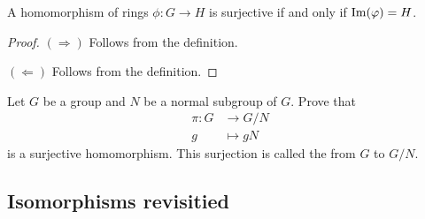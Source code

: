 \documentclass{ximera}
\begin{document}
\begin{lemma}
    A homomorphism of rings $\phi:G\to H$ is surjective if and only if
    $\operatorname{Im}(\varphi) = H$.
    \begin{proof}
      $(\Rightarrow)$ Follows from the definition.

      $(\Leftarrow)$ Follows from the definition.
    \end{proof}
\end{lemma}







\begin{exercise}
  Let $G$ be a group and $N$ be a normal subgroup of $G$. Prove that
  \begin{align*}
  \pi:G &\to G/N\\
  g &\mapsto gN
  \end{align*}
  is a surjective homomorphism. This surjection is called the
   from $G$ to $G/N$.
\end{exercise}





\subsection{Isomorphisms revisitied}
\end{document}
